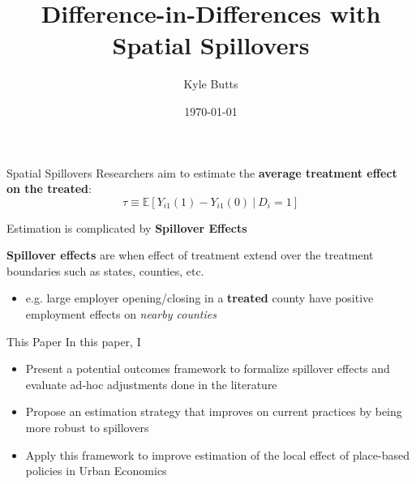 \documentclass[aspectratio=169]{beamer}
\title{Difference-in-Differences with Spatial Spillovers}
\date{\today}
\author{Kyle Butts}
\begin{document}
\maketitle

\begin{frame}{Spatial Spillovers}
    Researchers aim to estimate the \textbf{average treatment effect on the treated}: 
    \[
        \tau \equiv \mathbb{E} \left[ Y_{i1}(1) - Y_{i1}(0) \ \vert \ D_{i} = 1 \right]
    \]
    
    Estimation is complicated by \textbf{Spillover Effects}
    
    \vspace{5mm}
    \textbf{Spillover effects} are when effect of treatment extend over the treatment boundaries such as states, counties, etc.
    
    \begin{itemize}
        \item e.g. large employer opening/closing in a \textbf{treated} county have positive employment effects on \textit{nearby counties}
    \end{itemize}
\end{frame}

\begin{frame}{This Paper}
    In this paper, I

    \begin{itemize}
        \item Present a potential outcomes framework to formalize spillover effects and evaluate ad-hoc adjustments done in the literature
        
        \item Propose an estimation strategy that improves on current practices by being more robust to spillovers
        
        \item Apply this framework to improve estimation of the local effect of place-based policies in Urban Economics 
    \end{itemize}

\end{frame}
\end{document}

